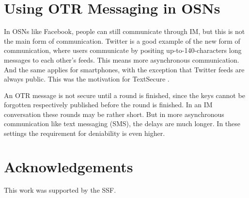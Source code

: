 \section{Using \acs{OTR} Messaging in \acsp{OSN}}

In \acp{OSN} like Facebook, people can still communicate through \ac{IM}, but 
this is not the main form of communication.
Twitter is a good example of the new form of communication, where users 
communicate by positing up-to-140-characters long messages to each other's 
feeds.
This means more asynchronous communication.
And the same applies for smartphones, with the exception that Twitter feeds are 
always public.
This was the motivation for TextSecure \cite{TSasynch}.

An \ac{OTR} message is not secure until a round is finished, since the keys 
cannot be forgotten respectively published before the round is finished.
In an \ac{IM} conversation these rounds may be rather short.
But in more asynchronous communication like text messaging (SMS), the delays 
are much longer.
In these settings the requirement for deniability is even higher.


\section*{Acknowledgements}

This work was supported by the SSF.


\printbibliography

